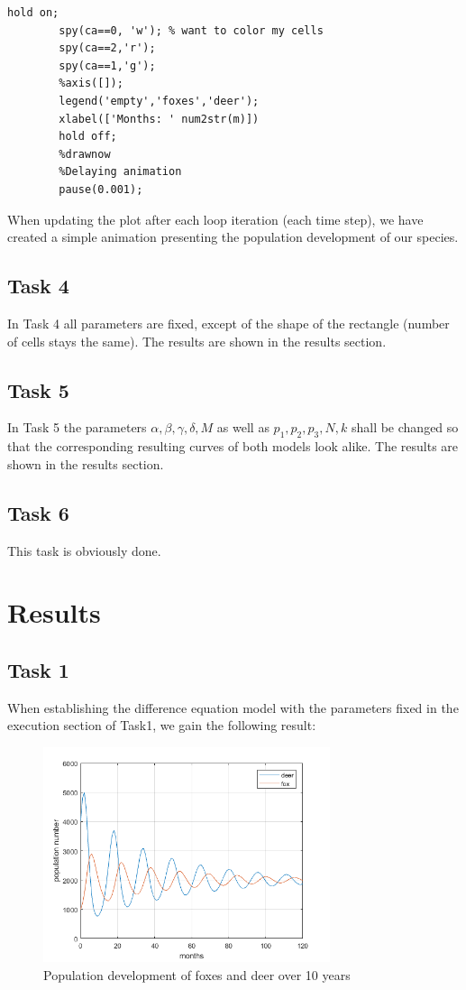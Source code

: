 \documentclass[a4paper,12pt]{article}
\begin{document}
\begin{lstlisting}[frame = single, caption = Implementation of CA animation, label=src:Task3] 		
 		hold on;
        spy(ca==0, 'w'); % want to color my cells
        spy(ca==2,'r');
        spy(ca==1,'g');
        %axis([]);
        legend('empty','foxes','deer');
        xlabel(['Months: ' num2str(m)])
        hold off;
        %drawnow
        %Delaying animation
        pause(0.001);
\end{lstlisting}            

When updating the plot after each loop iteration (each time step), we have created a simple animation presenting the population development of our species.

\subsection{Task 4}
In Task 4 all parameters are fixed, except of the shape of the rectangle (number of cells stays the same). The results are shown in the results section.
\subsection{Task 5}
In Task 5 the parameters $\alpha,\beta,\gamma,\delta,M$ as well as $p_1, p_2, p_3,N, k$ shall be changed so that the corresponding resulting
curves of both models look alike. The results are shown in the results section.
\subsection{Task 6}
This task is obviously done.

\section{Results}

\subsection{Task 1}
When establishing the difference equation model with the parameters fixed in the execution section of Task1, we gain the following result:\\

\begin{figure}[H]
\centering
\includegraphics[width=0.75\textwidth]{Task1}  
\caption[task1]{Population development of foxes and deer over 10 years}
\label{task1}
\end{figure} 
\end{document}
